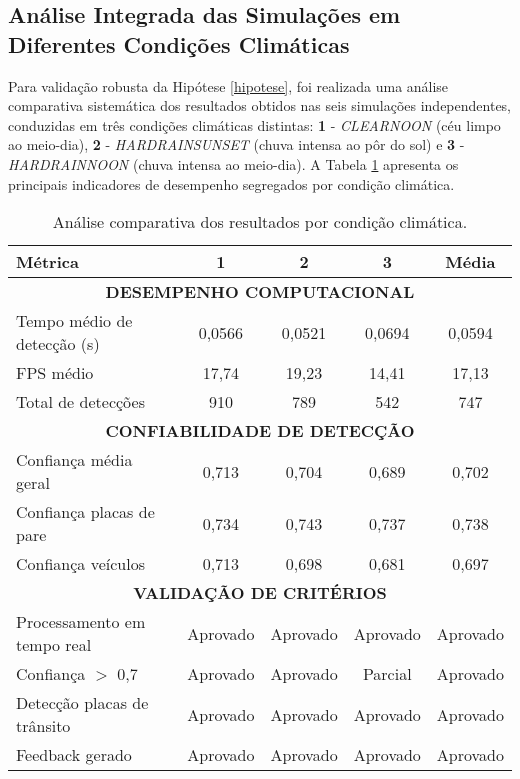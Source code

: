 \subsection{Análise Integrada das Simulações em Diferentes Condições Climáticas}

Para validação robusta da Hipótese \ref{hipotese}, foi realizada uma análise comparativa sistemática dos resultados obtidos nas seis simulações independentes, conduzidas em três condições climáticas distintas: \textbf{1} - \textit{CLEARNOON} (céu limpo ao meio-dia), \textbf{2} - \textit{HARDRAINSUNSET} (chuva intensa ao pôr do sol) e \textbf{3} - \textit{HARDRAINNOON} (chuva intensa ao meio-dia). A Tabela \ref{tab:resultados_por_clima} apresenta os principais indicadores de desempenho segregados por condição climática.

\begin{table}[H]
\centering
\renewcommand{\arraystretch}{1.3}
\begin{tabular}{|l|c|c|c|c|}
\hline
\textbf{Métrica} & \textbf{1} & \textbf{2} & \textbf{3} & \textbf{Média} \\
\hline
\multicolumn{5}{|c|}{\textbf{DESEMPENHO COMPUTACIONAL}} \\
\hline
Tempo médio de detecção (s) & 0,0566 & 0,0521 & 0,0694 & 0,0594 \\
\hline
FPS médio & 17,74 & 19,23 & 14,41 & 17,13 \\
\hline
Total de detecções & 910 & 789 & 542 & 747 \\
\hline
\multicolumn{5}{|c|}{\textbf{CONFIABILIDADE DE DETECÇÃO}} \\
\hline
Confiança média geral & 0,713 & 0,704 & 0,689 & 0,702 \\
\hline
Confiança placas de pare & 0,734 & 0,743 & 0,737 & 0,738 \\
\hline
Confiança veículos & 0,713 & 0,698 & 0,681 & 0,697 \\
\hline
\multicolumn{5}{|c|}{\textbf{VALIDAÇÃO DE CRITÉRIOS}} \\
\hline
Processamento em tempo real & \cellcolor{green!25}Aprovado & \cellcolor{green!25}Aprovado & \cellcolor{green!25}Aprovado & \cellcolor{green!25}Aprovado \\
\hline
Confiança $>$ 0,7 & \cellcolor{green!25}Aprovado & \cellcolor{green!25}Aprovado & \cellcolor{orange!25}Parcial & \cellcolor{green!25}Aprovado \\
\hline
Detecção placas de trânsito & \cellcolor{green!25}Aprovado & \cellcolor{green!25}Aprovado & \cellcolor{green!25}Aprovado & \cellcolor{green!25}Aprovado \\
\hline
Feedback gerado & \cellcolor{green!25}Aprovado & \cellcolor{green!25}Aprovado & \cellcolor{green!25}Aprovado & \cellcolor{green!25}Aprovado \\
\hline
\end{tabular}
\caption{Análise comparativa dos resultados por condição climática.}
\label{tab:resultados_por_clima}
\end{table}

